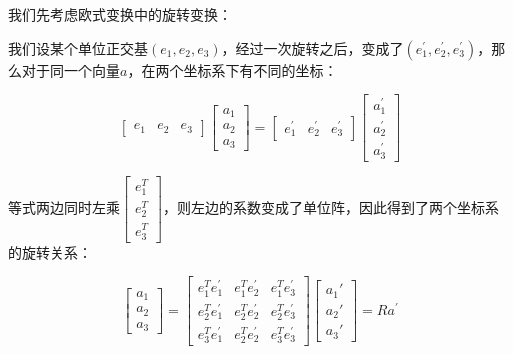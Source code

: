 \documentclass[10pt, oneside]{book}
\begin{document}
我们先考虑欧式变换中的旋转变换：

我们设某个单位正交基$(e_1,e_2,e_3)$，经过一次旋转之后，变成了$(e_1^\prime,e_2^\prime,e_3^\prime)$，那么对于同一个向量$a$，在两个坐标系下有不同的坐标：

\begin{equation}
    \begin{bmatrix}
        e_1 & e_2 & e_3
       \end{bmatrix}
       \begin{bmatrix}
        a_1\\
        a_2\\
        a_3
       \end{bmatrix}
       =
       \begin{bmatrix}
        e_1^\prime & e_2^\prime  & e_3^\prime 
       \end{bmatrix}
       \begin{bmatrix}
        a_1^\prime \\
        a_2^\prime \\
        a_3^\prime 
        \end{bmatrix}
\end{equation}

等式两边同时左乘$\begin{bmatrix}
    e_1^T\\
    e_2^T\\
    e_3^T
   \end{bmatrix}$，则左边的系数变成了单位阵，因此得到了两个坐标系的旋转关系：

\begin{equation}
    \begin{bmatrix}
        a_1\\
        a_2\\
        a_3
       \end{bmatrix}
       =
       \begin{bmatrix}
        e_1^Te_1^\prime & e_1^Te_2^\prime & e_1^Te_3^\prime\\
        e_2^Te_1^\prime & e_2^Te_2^\prime & e_2^Te_3^\prime\\
        e_3^Te_1^\prime & e_2^Te_2^\prime & e_3^Te_3^\prime
       \end{bmatrix}
       \begin{bmatrix}
        a_1\prime \\
        a_2\prime \\
        a_3\prime 
       \end{bmatrix}
       =
       Ra^\prime 
\end{equation}
\end{document}
